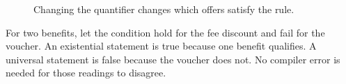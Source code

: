 \begin{figure}[H]
\centering
{}
\caption{Changing the quantifier changes which offers satisfy the rule.}\label{fig:teach-M03-01}
\end{figure}

For two benefits, let the condition hold for the fee discount and fail for the voucher. An existential statement is true because one benefit qualifies. A universal statement is false because the voucher does not. No compiler error is needed for those readings to disagree.

